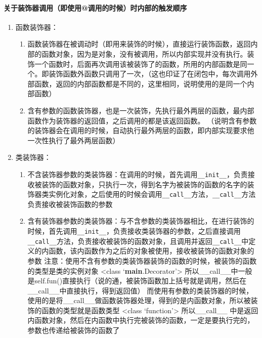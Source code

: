 \documentclass[11pt]{article}
\providecommand{\tightlist}{%
      \setlength{\itemsep}{0pt}\setlength{\parskip}{0pt}}
\begin{document}
    \hypertarget{ux5173ux4e8eux88c5ux9970ux5668ux8c03ux7528ux5373ux4f7fux7528ux8c03ux7528ux7684ux65f6ux5019ux65f6ux5185ux90e8ux7684ux89e6ux53d1ux987aux5e8f}{%
\paragraph{关于装饰器调用（即使用@调用的时候）时内部的触发顺序}\label{ux5173ux4e8eux88c5ux9970ux5668ux8c03ux7528ux5373ux4f7fux7528ux8c03ux7528ux7684ux65f6ux5019ux65f6ux5185ux90e8ux7684ux89e6ux53d1ux987aux5e8f}}

\begin{enumerate}
\def\labelenumi{\arabic{enumi}.}
\tightlist
\item
  函数装饰器：

  \begin{enumerate}
  \def\labelenumii{\alph{enumii}.}
  \tightlist
  \item
    函数装饰器在被调动时（即用来装饰的时候），直接运行装饰函数，返回内部的函数对象，因为是对象，没有被调用，所以内部实现并没有执行。装饰一个函数时，后面再次调用该被装饰了的函数，所用的内部函数是同一个。即装饰函数外函数只调用了一次，（这也印证了在闭包中，每次调用外部函数，返回的内部函数都是不同的，这里相同，说明使用的是同一个内部函数）
  \item
    含有参数的函数装饰器，也是一次装饰，先执行最外两层的函数，最内部函数作为装饰器的返回值，之后调用的都是该返回函数。
    （说明含有参数的装饰器会在调用的时候，自动执行最外两层的函数，即内部实现要求他一次性执行了最外两层函数）
  \end{enumerate}
\item
  类装饰器：

  \begin{enumerate}
  \def\labelenumii{\alph{enumii}.}
  \tightlist
  \item
    不含装饰器参数的类装饰器：在调用的时候，首先调用\texttt{\_\_init\_\_}，负责接收被装饰的函数对象，只执行一次，得到名字为被装饰的函数的名字的装饰器类实例化对象，之后使用的时候会调用\texttt{\_\_call\_\_}方法，\texttt{\_\_call\_\_}方法负责接收被装饰函数的参数
  \item
    含有装饰器参数的类装饰器：与不含参数的类装饰器相比，在进行装饰的时候，首先调用\texttt{\_\_init\_\_}，负责接收类装饰器的参数，之后直接调用\texttt{\_\_call\_\_}方法，负责接收被装饰的函数对象，且调用并返回\texttt{\_\_call\_\_}中定义的内函数，该内函数作为之后的对象被使用，接收被装饰的函数对象的参数
    注意：使用不含有参数的类装饰器装饰的函数的时候，被装饰的函数的类型是类的实例对象
    \textless{}class `\textbf{main}.Decorator'\textgreater{}
    所以\_\_call\_\_中一般是self.fun()直接执行（说的通，被装饰函数加上括号就是调用，然后在\_\_call\_\_中直接执行，得到返回值）
    而使用有参数的类装饰器的时候，使用的是将\_\_call\_\_做函数装饰器处理，得到的是内函数对象，所以被装饰的函数的类型就是函数类型
    \textless{}class `function'\textgreater{} 所以\_\_call\_\_
    中是返回内函数对象，然后在内函数中执行完被装饰的函数，一定是要执行完的，参数也传递给被装饰的函数了
  \end{enumerate}
\end{enumerate}
\end{document}

